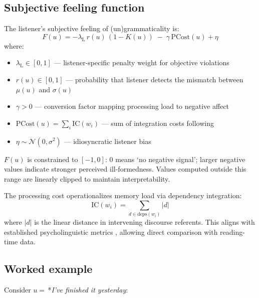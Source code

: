 \documentclass[12pt]{article}
\newcommand{\listener}{\mathrm{L}}
\begin{document}
\subsection{Subjective feeling function}

The listener's subjective feeling of (un)grammaticality is:
\begin{equation}\label{eq:F}
F(u)= -\lambda_{\listener}\,r(u)\,(1-K(u)) \;-\; \gamma\,\text{PCost}(u) + \eta
\end{equation}
where:
\begin{itemize}
  \item $\lambda_{\listener} \in [0,1]$ — listener-specific penalty weight for objective violations
  \item $r(u) \in [0,1]$ — probability that listener detects the mismatch between $\mu(u)$ and $\sigma(u)$
  \item $\gamma > 0$ — conversion factor mapping processing load to negative affect
  \item $\text{PCost}(u) = \sum_{i} \text{IC}(w_i)$ — sum of integration costs following \textcite{gibson2000}
  \item $\eta \sim \mathcal{N}(0,\sigma^{2})$ — idiosyncratic listener bias
\end{itemize}

$F(u)$ is constrained to $[-1,0]$: 0 means `no negative signal'; larger negative values indicate stronger perceived ill-formedness. Values computed outside this range are linearly clipped to maintain interpretability.

The processing cost operationalizes memory load via dependency integration:
\begin{equation}
\text{IC}(w_i) = \sum_{d \in \text{deps}(w_i)} |d|
\end{equation}
where $|d|$ is the linear distance in intervening discourse referents. This aligns with established psycholinguistic metrics \parencite{futrell2020}, allowing direct comparison with reading-time data.

\subsection{Worked example}

Consider $u=$\,*\textit{I've finished it yesterday}:
\end{document}
